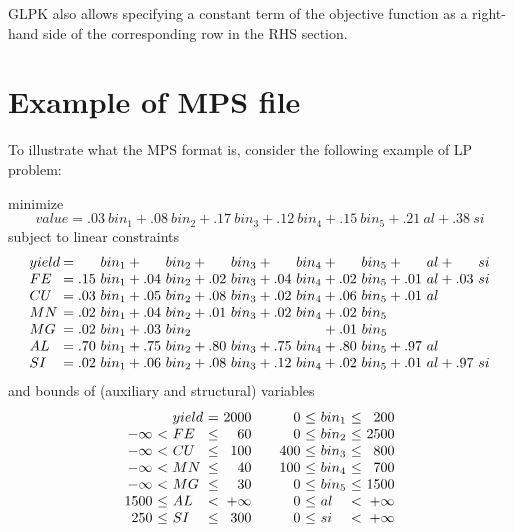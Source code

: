 GLPK also allows specifying a constant term of the objective function
as a right-hand side of the corresponding row in the RHS section.

\section{Example of MPS file}
\label{secmpsex}

To illustrate what the MPS format is, consider the following example of
LP problem:

\def\arraystretch{1.2}

\noindent\hspace{.5in}minimize
$$
value = .03\ bin_1 + .08\ bin_2 + .17\ bin_3 + .12\ bin_4 + .15\ bin_5
+ .21\ al + .38\ si
$$
\noindent\hspace{.5in}subject to linear constraints
$$
\begin{array}{@{}l@{\:}l@{}}
yield &= \ \ \ \ \;bin_1 + \ \ \ \ \;bin_2 + \ \ \ \ \;bin_3 +
         \ \ \ \ \;bin_4 + \ \ \ \ \;bin_5 + \ \ \ \ \;al +
         \ \ \ \ \;si \\
FE    &= .15\ bin_1 + .04\ bin_2 + .02\ bin_3 + .04\ bin_4 + .02\ bin_5
         + .01\ al + .03\ si \\
CU    &= .03\ bin_1 + .05\ bin_2 + .08\ bin_3 + .02\ bin_4 + .06\ bin_5
         + .01\ al \\
MN    &= .02\ bin_1 + .04\ bin_2 + .01\ bin_3 + .02\ bin_4 + .02\ bin_5
         \\
MG    &= .02\ bin_1 + .03\ bin_2
\ \ \ \ \ \ \ \ \ \ \ \ \ \ \ \ \ \ \ \ \ \ \ \ \ \ \ \ + .01\ bin_5 \\
AL    &= .70\ bin_1 + .75\ bin_2 + .80\ bin_3 + .75\ bin_4 + .80\ bin_5
         + .97\ al \\
SI    &= .02\ bin_1 + .06\ bin_2 + .08\ bin_3 + .12\ bin_4 + .02\ bin_5
         + .01\ al + .97\ si \\
\end{array}
$$
\noindent\hspace{.5in}and bounds of (auxiliary and structural)
variables
$$
\begin{array}{r@{\ }l@{\ }l@{\ }l@{\ }rcr@{\ }l@{\ }l@{\ }l@{\ }r}
&&yield&=&2000&&0&\leq&bin_1&\leq&200\\
-\infty&<&FE&\leq&60&&0&\leq&bin_2&\leq&2500\\
-\infty&<&CU&\leq&100&&400&\leq&bin_3&\leq&800\\
-\infty&<&MN&\leq&40&&100&\leq&bin_4&\leq&700\\
-\infty&<&MG&\leq&30&&0&\leq&bin_5&\leq&1500\\
1500&\leq&AL&<&+\infty&&0&\leq&al&<&+\infty\\
250&\leq&SI&\leq&300&&0&\leq&si&<&+\infty\\
\end{array}
$$

